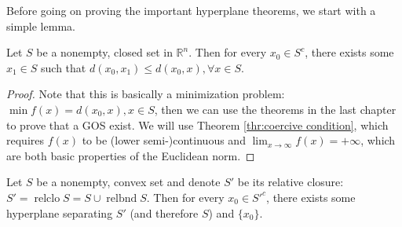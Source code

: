 Before going on proving the important hyperplane theorems, we start with a
simple lemma.

\begin{lemma}
\label{lem:Existence of closest element}
  Let \( S \) be a nonempty, closed set in \( \mathbb{R}^{n} \).
  Then for every \( x_{0} \in S^{c} \), there exists some \( x_{1} \in S \)
  such that \( d(x_{0}, x_{1}) \le d(x_{0}, x), \forall x \in S \).
\end{lemma}

\begin{proof}
  Note that this is basically a minimization problem: \( \min f(x) = d(x_{0}, x), x \in
  S\), then we can use the theorems in the last chapter to prove that a GOS
  exist. We will use Theorem \ref{thr:coercive condition}, which requires \(
  f(x) \) to be (lower semi-)continuous and \( \lim_{x \to \infty} f(x) =
  +\infty \), which are both basic properties of the Euclidean norm.
\end{proof}

\begin{theorem}
\label{thr:hst-closed-pt}
  Let \( S \) be a nonempty, convex set and denote \( S' \) be its relative
  closure: \( S' = \operatorname{relclo} S = S \cup \operatorname{relbnd} S \).
  Then for every \( x_{0} \in S'^{c} \),
  there exists some hyperplane separating \( S' \) (and therefore \( S \))
  and \( \{x_{0}\}   \).
\end{theorem}

